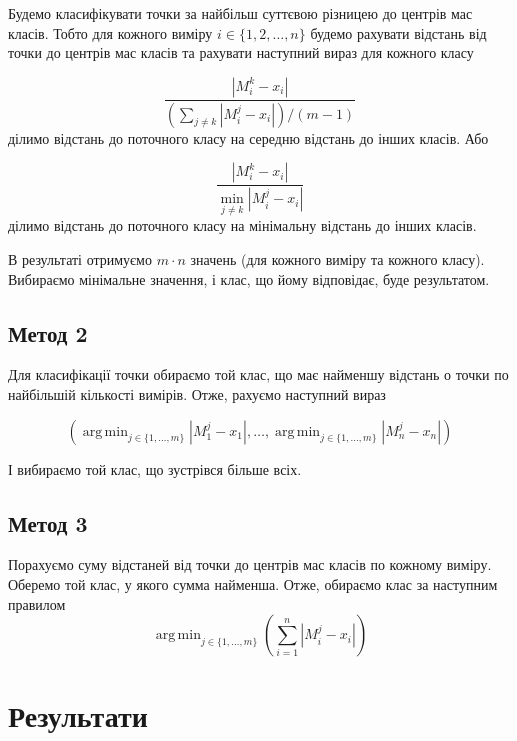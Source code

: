 \documentclass[a4paper,12pt]{article}
\DeclareMathOperator*{\argmin}{arg\,min}
\begin{document}
Будемо класифікувати точки за найбільш суттєвою різницею до центрів мас класів. Тобто для кожного виміру $i \in \{1,2,\ldots, n \}$ будемо рахувати відстань від точки до центрів мас класів та рахувати наступний вираз для кожного класу

\begin{equation}
	\frac{|M^k_i -x_i|}{ \left(\sum_{j \ne k} |M^j_i - x_i|\right)/(m-1)}
\end{equation}
ділимо відстань до поточного класу на середню відстань до інших класів. Або

\begin{equation} \label{eq_min}
	\frac{|M^k_i -x_i|}{\min_{j \ne k} |M^j_i - x_i|}
\end{equation}
ділимо відстань до поточного класу на мінімальну відстань до інших класів.

В результаті отримуємо $m \cdot n$ значень (для кожного виміру та кожного класу). Вибираємо мінімальне значення, і клас, що йому відповідає, буде результатом.

\subsection{Метод 2}

Для класифікації точки обираємо той клас, що має найменшу відстань о точки по найбільшій кількості вимірів. Отже, рахуємо наступний вираз

\begin{equation}
	\left( \argmin_{j \in\{1,\ldots, m\}}|M^j_1 - x_1|, \ldots, \argmin_{j \in \{1,\ldots, m\}}|M^j_n - x_n| \right)
\end{equation}

І вибираємо той клас, що зустрівся більше всіх.

\subsection{Метод 3}

Порахуємо суму відстаней від точки до центрів мас класів по кожному виміру. Оберемо той клас, у якого сумма найменша. Отже, обираємо клас за наступним правилом
\begin{equation}
	\argmin_{j \in \{1,\ldots, m\}} \left( \sum_{i=1}^n |M_i^j - x_i| \right)
\end{equation}


\section{Результати}
\end{document}
